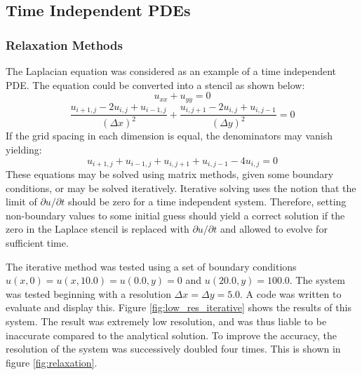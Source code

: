\documentclass[twocolumn]{article}
\begin{document}
\subsection{Time Independent PDEs}
\subsubsection{Relaxation Methods}

The Laplacian equation was considered as an example of a time independent PDE. The equation could be converted into a stencil as shown below:
\begin{equation}
u_{xx} + u_{yy} = 0
\end{equation}
\begin{equation}
\frac{u_{i+1,j} - 2u_{i,j} + u_{i-1,j}}{(\Delta x)^2} + \frac{u_{i,j+1} - 2u_{i,j} + u_{i,j-1}}{(\Delta{y})^2} =0 
\end{equation}
If the grid spacing in each dimension is equal, the denominators may vanish yielding:
\begin{equation}
u_{i+1,j} + u_{i-1,j} + u_{i,j+1} + u_{i,j-1} - 4u_{i,j}=0
\end{equation}
These equations may be solved using matrix methods, given some boundary conditions, or may be solved iteratively. Iterative solving uses the notion that the limit of $\partial u/ \partial t$ should be zero for a time independent system. Therefore, setting non-boundary values to some initial guess should yield a correct solution if the zero in the Laplace stencil is replaced with  $\partial u/ \partial t$ and allowed to evolve for sufficient time. 

The iterative method was tested using a set of boundary conditions $u(x,0) = u(x,10.0) = u(0.0,y)=0$ and $u(20.0,y)=100.0$. The system was tested beginning with a resolution $\Delta x = \Delta y = 5.0$. A code was written to evaluate and display this. Figure \ref{fig:low_res_iterative} shows the results of this system. The result was extremely low resolution, and was thus liable to be inaccurate compared to the analytical solution. To improve the accuracy, the resolution of the system was successively doubled four times. This is shown in figure \ref{fig:relaxation}. 
\end{document}
